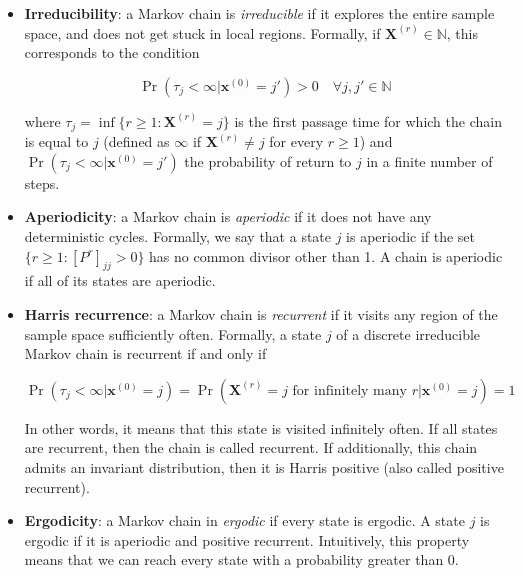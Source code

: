 \documentclass[12pt]{memoir}
\newcommand{\mb}{\mathbf}
\newcommand{\tb}{\textbf}
\newcommand{\ti}{\textit}
\begin{document}
\begin{itemize}

    \item \tb{Irreducibility}: a Markov chain is \ti{irreducible} if it explores the entire sample space, and does not get stuck in local regions. Formally, if $\mb X^{(r)}\in \mathbb{N}$, this corresponds to the condition

    \begin{equation}
        \Pr(\tau_j < \infty | \mb x^{(0)} = j') > 0\quad \forall j,j' \in \mathbb{N}
    \end{equation}

    where $\tau_j = \inf\{r\geq 1: \mb X^{(r)} = j\}$ is the first passage time for which the chain is equal to $j$ (defined as $\infty$ if $\mb X^{(r)} \neq j$ for every $r\geq 1$) and $\Pr(\tau_j < \infty | \mb x^{(0)} = j')$ the probability of return to $j$ in a finite number of steps.

    \item \tb{Aperiodicity}: a Markov chain is \ti{aperiodic} if it does not have any deterministic cycles. Formally, we say that a state $j$ is aperiodic if the set $\{r\geq1: [P^r]_{jj} > 0\}$ has no common divisor other than 1. A chain is aperiodic if all of its states are aperiodic.

    \item \tb{Harris recurrence}:  a Markov chain is \ti{recurrent} if it visits any region of the sample space sufficiently often. Formally, a state $j$ of a discrete irreducible Markov chain is recurrent if and only if

    \begin{equation}
        \Pr(\tau_j < \infty |\mb x^{(0)} = j) = \Pr(\mb X^{(r)} = j \text{ for infinitely many } r | \mb x^{(0)}=j) = 1
    \end{equation}

    In other words, it means that this state is visited infinitely often. If all states are recurrent, then the chain is called recurrent. If additionally, this chain admits an invariant distribution, then it is Harris positive (also called positive recurrent).

    \item \tb{Ergodicity}: a Markov chain in \ti{ergodic} if every state is ergodic. A state $j$ is ergodic if it is aperiodic and positive recurrent. Intuitively, this property means that we can reach every state with a probability greater than 0.

\end{itemize}
\end{document}
